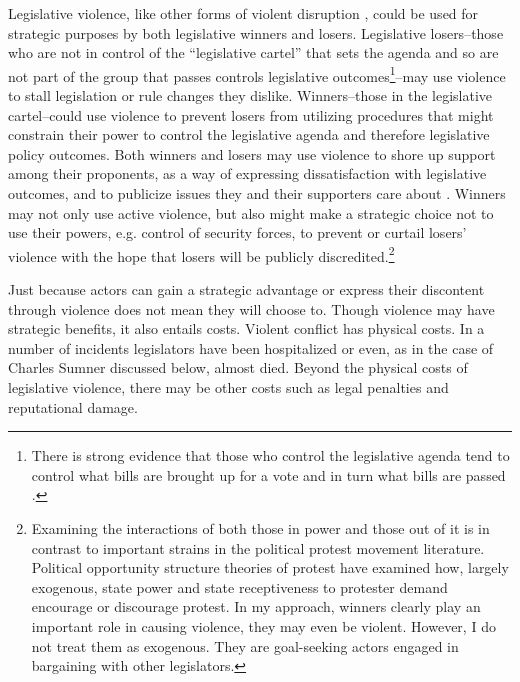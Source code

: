 \documentclass[a4paper]{article}\usepackage[]{graphicx}\usepackage[]{color}
\begin{document}
Legislative violence, like other forms of violent disruption \citep[]{Beaulieu2008,BeaulieuForthcoming,wilkinson2006}, could be used for strategic purposes by both legislative winners and losers. Legislative losers--those who are not in control of the ``legislative cartel''  that sets the agenda \citep{cox2007} and so are not part of the group that passes controls legislative outcomes\footnote{There is strong evidence that those who control the legislative agenda tend to control what bills are brought up for a vote and in turn what bills are passed \citep[93]{tsebelis2002}.}--may use violence to stall legislation or rule changes they dislike. Winners--those in the legislative cartel--could use violence to prevent losers from utilizing procedures that might constrain their power to control the legislative agenda and therefore legislative policy outcomes. Both winners and losers may use violence to shore up support among their proponents, as a way of expressing dissatisfaction with legislative outcomes, and to publicize issues they and their supporters care about \citep{Spary2013}. Winners may not only use active violence, but also might make a strategic choice not to use their powers, e.g. control of security forces, to prevent or curtail losers' violence with the hope that losers will be publicly discredited.\footnote{Examining the interactions of both those in power and those out of it is in contrast to important strains in the political protest movement literature. Political opportunity structure theories of protest have examined how, largely exogenous, state power \citep{skocpol1979} and state receptiveness to protester demand \citep{mcadam1982,tarrow1989} encourage or discourage protest. In my approach, winners clearly play an important role in causing violence, they may even be violent. However, I do not treat them as exogenous. They are goal-seeking actors engaged in bargaining with other legislators.}

Just because actors can gain a strategic advantage or express their discontent through violence does not mean they will choose to. Though violence may have strategic benefits, it also entails costs. Violent conflict has physical costs. In a number of incidents legislators have been hospitalized or even, as in the case of Charles Sumner discussed below, almost died. Beyond the physical costs of legislative violence, there may be other costs such as legal penalties and reputational damage.
\end{document}
